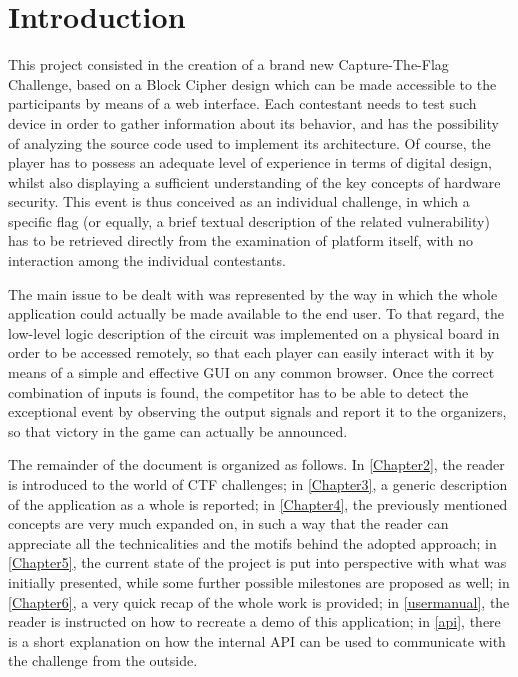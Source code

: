 \chapter{Introduction}
This project consisted in the creation of a brand new Capture-The-Flag Challenge, based on a Block Cipher design which can be made accessible to the participants by means of a web interface.
Each contestant needs to test such device in order to gather information about its behavior, and has the possibility of analyzing the source code used to implement its architecture.
Of course, the player has to possess an adequate level of experience in terms of digital design, whilst also displaying a sufficient understanding of the key concepts of hardware security.
This event is thus conceived as an individual challenge, in which a specific flag (or equally, a brief textual description of the related vulnerability) has to be retrieved directly from the examination of platform itself, with no interaction among the individual contestants.

The main issue to be dealt with was represented by the way in which the whole application could actually be made available to the end user.
To that regard, the low-level logic description of the circuit was implemented on a physical board in order to be accessed remotely, so that each player can easily interact with it by means of a simple and effective GUI on any common browser.
Once the correct combination of inputs is found, the competitor has to be able to detect the exceptional event by observing the output signals and report it to the organizers, so that victory in the game can actually be announced.

The remainder of the document is organized as follows. In \autoref{Chapter2}, the reader is introduced to the world of CTF challenges; in \autoref{Chapter3}, a generic description of the application as a whole is reported;
in \autoref{Chapter4}, the previously mentioned concepts are very much expanded on, in such a way that the reader can appreciate all the technicalities and the motifs behind the adopted approach;
in \autoref{Chapter5}, the current state of the project is put into perspective with what was initially presented, while some further possible milestones are proposed as well; in \autoref{Chapter6}, a very quick recap of the whole work is provided;
in \autoref{usermanual}, the reader is instructed on how to recreate a demo of this application; in \autoref{api}, there is a short explanation on how the internal API can be used to communicate with the challenge from the outside.